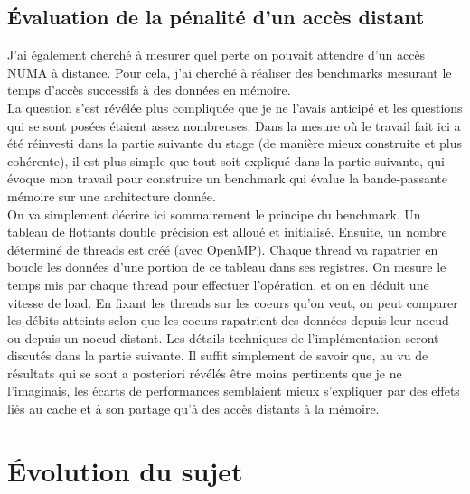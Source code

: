 \documentclass{report}
\begin{document}
\subsection{Évaluation de la pénalité d'un accès distant}
J'ai également cherché à mesurer quel perte on pouvait attendre d'un accès NUMA à distance. Pour cela, j'ai
cherché à réaliser des benchmarks mesurant le temps d'accès successifs à des données en mémoire.
\\La question s'est révélée plus compliquée que je ne l'avais anticipé et les questions qui se sont posées
étaient assez nombreuses. Dans la mesure où le travail fait ici a été réinvesti dans la partie suivante du
stage (de manière mieux construite et plus cohérente), il est plus simple que tout soit expliqué dans 
la partie suivante, qui évoque mon travail pour construire un benchmark qui évalue la bande-passante mémoire
sur une architecture donnée. 
\\On va simplement décrire ici sommairement le principe du benchmark. Un tableau de flottants double précision
est alloué et initialisé. Ensuite, un nombre déterminé de threads est créé (avec OpenMP). Chaque thread va 
rapatrier en boucle les données d'une portion de ce tableau dans ses registres. On mesure le temps mis par
chaque thread pour effectuer l'opération, et on en déduit une vitesse de load. En fixant les threads sur les
coeurs qu'on veut, on peut comparer les débits atteints selon que les coeurs rapatrient des données depuis leur
noeud ou depuis un noeud distant. Les détails techniques de l'implémentation seront discutés dans la partie 
suivante. Il suffit simplement de savoir que, au vu de résultats qui se sont a posteriori révélés être moins 
pertinents que je ne l'imaginais, les écarts de performances semblaient mieux s'expliquer par des effets
liés au cache et à son partage qu'à des accès distants à la mémoire.
\section{Évolution du sujet}
\end{document}
